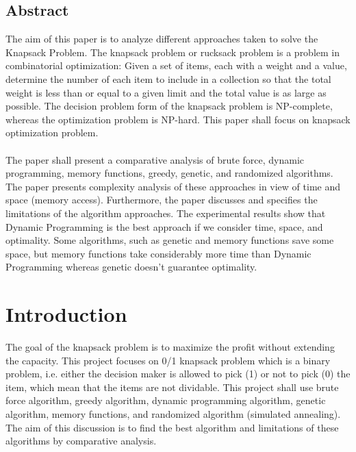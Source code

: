 \documentclass[a4paper, 11pt]{article}
\begin{document}
\begin{center}
\section*{Abstract}
\end{center}
The aim of this paper is to analyze different approaches taken to solve the Knapsack Problem. The knapsack problem or rucksack problem is a problem in combinatorial optimization: Given a set of items, each with a weight and a value, determine the number of each item to include in a collection so that the total weight is less than or equal to a given limit and the total value is as large as possible. The decision problem form of the knapsack problem is NP-complete, whereas the optimization problem is NP-hard. This paper shall focus on knapsack optimization problem. \\ \\
The paper shall present a comparative analysis of brute force, dynamic programming, memory functions, greedy, genetic, and randomized algorithms. The paper presents complexity analysis of these approaches in view of time and space (memory access). Furthermore, the paper discusses and specifies the limitations of the algorithm approaches. The experimental results show that Dynamic Programming is the best approach if we consider time, space, and optimality. Some algorithms, such as genetic and memory functions save some space, but memory functions take considerably more time than Dynamic Programming whereas genetic doesn't guarantee optimality.


\pagebreak
\tableofcontents
\pagebreak

\section{Introduction}
The goal of the knapsack problem is to maximize the profit without extending the capacity. This project focuses on 0/1 knapsack problem which is a binary problem, i.e. either the decision maker is allowed to pick (1) or not to pick (0) the item, which mean that the items are not dividable. This project shall use brute force algorithm, greedy algorithm, dynamic programming algorithm, genetic algorithm, memory functions, and randomized algorithm (simulated annealing). The aim of this discussion is to find the best algorithm and limitations of these algorithms by comparative analysis.
\end{document}
